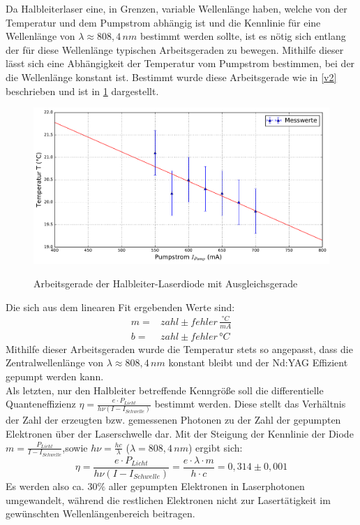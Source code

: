 \documentclass[twoside,colorback,accentcolor=tud4c,11pt]{tudreport}
\begin{document}
Da Halbleiterlaser eine, in Grenzen, variable Wellenlänge haben, welche von der Temperatur und dem Pumpstrom abhängig ist und die Kennlinie für eine Wellenlänge von $\lambda\approx 808,4\,\si{nm}$ bestimmt werden sollte, ist es nötig sich entlang der für diese Wellenlänge typischen Arbeitsgeraden zu bewegen. Mithilfe dieser lässt sich eine Abhängigkeit der Temperatur vom Pumpstrom bestimmen, bei der die Wellenlänge konstant ist. Bestimmt wurde diese Arbeitsgerade wie in \ref{v2} beschrieben und ist in \ref{ad} dargestellt.
\begin{figure}[H]
\centering
   	\begin{minipage}[b]{0.9\textwidth}
   	\includegraphics[width=\textwidth]{graphics/arbeitsgerade_hld.pdf}
  	\label{ad}
   	\end{minipage}
\caption{Arbeitsgerade der Halbleiter-Laserdiode mit Ausgleichsgerade}	
\end{figure}
Die sich aus dem linearen Fit ergebenden Werte sind:
\begin{align}
m=&zahl \pm fehler\,\si{\frac{°C}{mA}}\\
b=&zahl \pm fehler\,\si{°C}
\end{align}
Mithilfe dieser Arbeitsgeraden wurde die Temperatur stets so angepasst, dass die Zentralwellenlänge von $\lambda\approx 808,4\,\si{nm}$ konstant bleibt und der Nd:YAG Effizient gepumpt werden kann.\\
Als letzten, nur den Halbleiter betreffende Kenngröße soll die differentielle Quanteneffizienz $\eta=\frac{e\cdot P_{Licht}}{h\nu (I-I_{Schwelle})}$ bestimmt werden. Diese stellt das Verhältnis der Zahl der erzeugten bzw. gemessenen Photonen zu der Zahl der gepumpten Elektronen über der Laserschwelle dar. Mit der Steigung der Kennlinie der Diode $m=\frac{P_{Licht}}{I-I_{Schwelle}}$,sowie $h\nu=\frac{hc}{\lambda}$ ($\lambda=808,4\,\si{nm}$) ergibt sich:
\begin{equation}
\eta=\frac{e\cdot P_{Licht}}{h\nu (I-I_{Schwelle})}=\frac{e\cdot\lambda\cdot m}{h\cdot c}=0,314 \pm 0,001
\end{equation}
Es werden also ca. $30\%$ aller gepumpten Elektronen in Laserphotonen umgewandelt, während die restlichen Elektronen nicht zur Lasertätigkeit im gewünschten Wellenlängenbereich beitragen.
\end{document}
